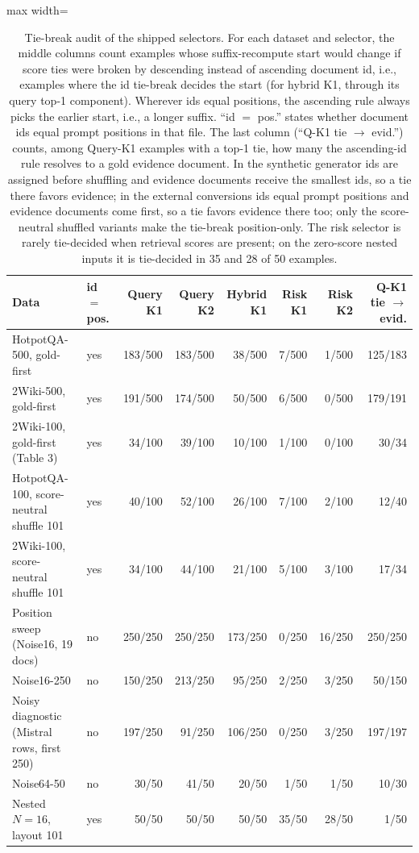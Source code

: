 \begin{table}[t]
\centering
\footnotesize
\setlength{\tabcolsep}{4pt}
\begin{adjustbox}{max width=\textwidth}
\begin{tabular}{llrrrrrr}
\toprule
Data & id $=$ pos. & Query K1 & Query K2 & Hybrid K1 & Risk K1 & Risk K2 & Q-K1 tie $\to$ evid. \\
\midrule
HotpotQA-500, gold-first & yes & 183/500 & 183/500 & 38/500 & 7/500 & 1/500 & 125/183 \\
2Wiki-500, gold-first & yes & 191/500 & 174/500 & 50/500 & 6/500 & 0/500 & 179/191 \\
2Wiki-100, gold-first (Table 3) & yes & 34/100 & 39/100 & 10/100 & 1/100 & 0/100 & 30/34 \\
HotpotQA-100, score-neutral shuffle 101 & yes & 40/100 & 52/100 & 26/100 & 7/100 & 2/100 & 12/40 \\
2Wiki-100, score-neutral shuffle 101 & yes & 34/100 & 44/100 & 21/100 & 5/100 & 3/100 & 17/34 \\
Position sweep (Noise16, 19 docs) & no & 250/250 & 250/250 & 173/250 & 0/250 & 16/250 & 250/250 \\
Noise16-250 & no & 150/250 & 213/250 & 95/250 & 2/250 & 3/250 & 50/150 \\
Noisy diagnostic (Mistral rows, first 250) & no & 197/250 & 91/250 & 106/250 & 0/250 & 3/250 & 197/197 \\
Noise64-50 & no & 30/50 & 41/50 & 20/50 & 1/50 & 1/50 & 10/30 \\
Nested $N{=}16$, layout 101 & yes & 50/50 & 50/50 & 50/50 & 35/50 & 28/50 & 1/50 \\
\bottomrule
\end{tabular}
\end{adjustbox}
\caption{Tie-break audit of the shipped selectors. For each dataset and selector, the middle columns count examples whose suffix-recompute start would change if score ties were broken by descending instead of ascending document id, i.e., examples where the id tie-break decides the start (for hybrid K1, through its query top-1 component). Wherever ids equal positions, the ascending rule always picks the earlier start, i.e., a longer suffix. ``id $=$ pos.'' states whether document ids equal prompt positions in that file. The last column (``Q-K1 tie $\to$ evid.'') counts, among Query-K1 examples with a top-1 tie, how many the ascending-id rule resolves to a gold evidence document. In the synthetic generator ids are assigned before shuffling and evidence documents receive the smallest ids, so a tie there favors evidence; in the external conversions ids equal prompt positions and evidence documents come first, so a tie favors evidence there too; only the score-neutral shuffled variants make the tie-break position-only. The risk selector is rarely tie-decided when retrieval scores are present; on the zero-score nested inputs it is tie-decided in 35 and 28 of 50 examples.}
\label{tab:app-tie-break}
\end{table}
